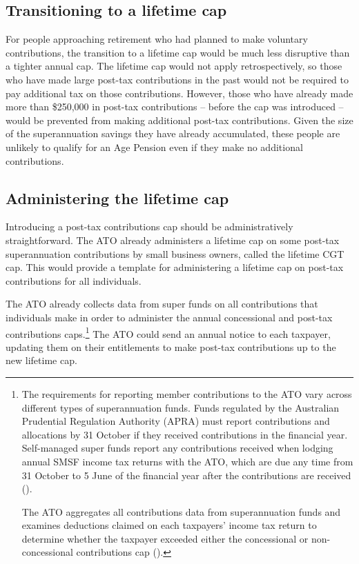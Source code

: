 \documentclass{grattanAlpha}
\begin{document}
\subsection{Transitioning to a lifetime cap}
For people approaching retirement who had planned to make voluntary contributions, the transition to a lifetime cap would be much less disruptive than a tighter annual cap. The lifetime cap would not apply retrospectively, so those who have made large post-tax contributions in the past would not be required to pay additional tax on those contributions. However, those who have already made more than \$250,000 in post-tax contributions – before the cap was introduced – would be prevented from making additional post-tax contributions. Given the size of the superannuation savings they have already accumulated, these people are unlikely to qualify for an Age Pension even if they make no additional contributions.

\subsection{Administering the lifetime cap}
Introducing a post-tax contributions cap should be administratively straightforward. The ATO already administers a lifetime cap on some post-tax superannuation contributions by small business owners, called the lifetime CGT cap. This would provide a template for administering a lifetime cap on post-tax contributions for all individuals.

The ATO already collects data from super funds on all contributions that individuals make in order to administer the annual concessional and post-tax contributions caps.\footnote{The requirements for reporting member contributions to the ATO vary across different types of superannuation funds. Funds regulated by the Australian Prudential Regulation Authority (APRA) must report contributions and allocations by 31 October if they received contributions in the financial year. Self-managed super funds report any contributions received when lodging annual SMSF income tax returns with the ATO, which are due any time from 31 October to 5 June of the financial year after the contributions are received (\textcite{ATO2015l}).

The ATO aggregates all contributions data from superannuation funds and examines deductions claimed on each taxpayers’ income tax return to determine whether the taxpayer exceeded either the concessional or non-concessional contributions cap  (\textcite[][12]{InspectorGeneralTaxation2014-Review-into-super-excess-contr-tax}).
}  The ATO could send an annual notice to each taxpayer, updating them on their entitlements to make post-tax contributions up to the new lifetime cap. 
\end{document}
